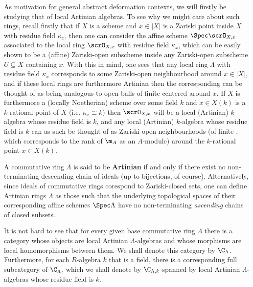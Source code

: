        As motivation for general abstract deformation contexts, we will firstly be studying that of local Artinian algebras. To see why we might care about such rings, recall firstly that if $X$ is a scheme and $x \in |X|$ is a Zariski point inside $X$ with residue field $\kappa_x$, then one can consider the affine scheme $\Spec \scrO_{X, x}$ associated to the local ring $\scrO_{X, x}$ with residue field $\kappa_x$, which can be easily shown to be a (affine) Zariski-open subscheme inside any Zariski-open subscheme $U \subseteq X$ containing $x$. With this in mind, one sees that any local ring $\Lambda$ with residue field $\kappa_x$ corresponds to some  Zariski-open neighbourhood around $x \in |X|$, and if these local rings are furthermore Artinian then the corresponding  can be thought of as being analogous to open balls of finite  centered around $x$. If $X$ is furthermore a (locally Noetherian) scheme over some field $k$ and $x \in X(k)$ is a $k$-rational point of $X$ (i.e. $\kappa_x \cong k$) then $\scrO_{X, x}$ will be a local (Artinian) $k$-algebra whose residue field is $k$, and any local (Artinian) $k$-algebra whose residue field is $k$ can as such be thought of as  Zariski-open neighbourhoods (of finite , which corresponds to the rank of $\m_A$ as an $A$-module) around the $k$-rational point $x \in X(k)$. 
        \begin{definition} \label{def: artinian_rings} 
            A commutative ring $\Lambda$ is said to be \textbf{Artinian} if and only if there exist no non-terminating descending chain of ideals (up to bijections, of course). Alternatively, since ideals of commutative rings corespond to Zariski-closed sets, one can define Artinian rings $\Lambda$ as those such that the underlying topological spaces of their corresponding affine schemes $\Spec \Lambda$ have no non-terminating \textit{ascending} chains of closed subsets. 
            
            It is not hard to see that for every given base commutative ring $\Lambda$ there is a category whose objects are local Artinian $\Lambda$-algebras and whose morphisms are local homomorphisms between them. We shall denote this category by $\C_{\Lambda}$. Furthermore, for each $R$-algebra $k$ that is a field, there is a corresponding full subcategory of $\C_{\Lambda}$, which we shall denote by $\C_{\Lambda, k}$ spanned by local Artinian $\Lambda$-algebras whose residue field is $k$. 
        \end{definition}
        
